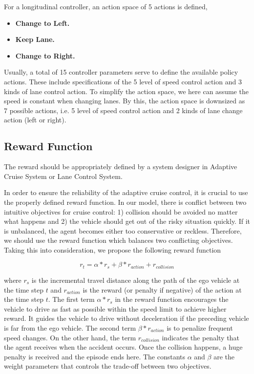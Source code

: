 For a longitudinal controller, an action space of 5 actions is defined,

\begin{itemize}

    \item \textbf{Change to Left.}
    
    \item \textbf{Keep Lane.} 
    
    \item \textbf{Change to Right.} 

\end{itemize}

Usually, a total of 15 controller parameters serve to define the available policy actions. These include specifications of the 5 level of speed control action and 3 kinds of lane control action. To simplify the action space, we here can assume the speed is constant when changing lanes. By this, the action space is downsized as 7 possible actions, i.e. 5 level of speed control action and 2 kinds of lane change action (left or right).

\subsection{Reward Function}

The reward should be appropriately defined by a system designer in Adaptive Cruise System or Lane Control System.

In order to ensure the reliability of the adaptive cruise control, it is crucial to use the properly defined reward function. In our model, there is conflict between two intuitive objectives for cruise control: 1) collision should be avoided no matter what happens and 2) the vehicle should get out of the risky situation quickly. If it is unbalanced, the agent becomes either too conservative or reckless. Therefore, we should use the reward function which balances two conflicting objectives. Taking this into consideration, we propose the following reward function

\begin{equation} \label{eq:reward-func1}
r_t = \alpha * r_s + \beta *  r_{action} + r_{collision}
\end{equation}

where $r_s$ is the incremental travel distance along the path of the ego vehicle at the time step $t$ and $r_{action}$  is the reward (or penalty if negative) of the action at the time step $t$. The first term $ \alpha * r_s $ in the reward function encourages the vehicle to drive as fast as possible within the speed limit to achieve higher reward. It guides the vehicle to drive without deceleration if the preceding vehicle is far from the ego vehicle. The second term $\beta *  r_{action}$ is to penalize frequent speed changes. On the other hand, the term $r_{collision}$ indicates the penalty that the agent receives when the accident occurs. Once the collision happens, a huge penalty is received and the episode ends here. The constants $\alpha$ and $\beta$ are the weight parameters that controls the trade-off between two objectives.

